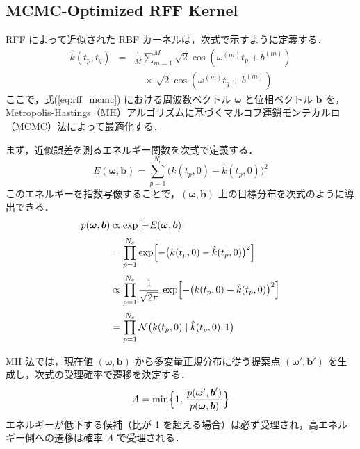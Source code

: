 \documentclass[conference]{IEEEtran}
\begin{document}
\subsection{MCMC-Optimized RFF Kernel}
RFF によって近似された RBF カーネルは，次式で示すように定義する．
\begin{eqnarray}
  \hat{k}(t_p,t_q)
    &=& \frac{1}{M}\sum_{m=1}^M \sqrt{2}\cos(\omega^{(m)}t_p + b^{(m)}) \nonumber\\
    &&\quad \times\,\sqrt{2}\cos(\omega^{(m)}t_q + b^{(m)})
  \label{eq:rff_mcmc}
\end{eqnarray}
ここで，式(\ref{eq:rff_mcmc}) における周波数ベクトル $\boldsymbol{\omega}$ と位相ベクトル $\boldsymbol{b}$ を，Metropolis-Hastings（MH）アルゴリズムに基づくマルコフ連鎖モンテカルロ（MCMC）法\cite{Hastings1970}によって最適化する．

まず，近似誤差を測るエネルギー関数を次式で定義する．
\begin{equation}
  E(\boldsymbol{\omega},\boldsymbol{b})
    = \sum_{p=1}^{N_c}
      \bigl(k(t_p,0) - \hat{k}(t_p,0)\bigr)^2
  \label{eq:energy}
\end{equation}
このエネルギーを指数写像することで，$(\boldsymbol{\omega},\boldsymbol{b})$ 上の目標分布を次式のように導出できる．
\begin{equation}
\begin{aligned}
  p(\boldsymbol{\omega},\boldsymbol{b})
  &\propto \exp\bigl[-E(\boldsymbol{\omega},\boldsymbol{b})\bigr] \\[2pt]
  &= \prod_{p=1}^{N_c}\exp\Bigl[-\bigl(k(t_p,0)-\hat{k}(t_p,0)\bigr)^2\Bigr] \\[2pt]
  &\propto \prod_{p=1}^{N_c}\frac{1}{\sqrt{2\pi}}\,
    \exp\Bigl[-\bigl(k(t_p,0)-\hat{k}(t_p,0)\bigr)^2\Bigr] \\[2pt]
  &= \prod_{p=1}^{N_c}
    \mathcal{N}\bigl(k(t_p,0)\mid\hat{k}(t_p,0),1\bigr)
\end{aligned}
\label{eq:target}
\end{equation}

MH 法では，現在値 $(\boldsymbol{\omega},\boldsymbol{b})$ から多変量正規分布に従う提案点 $(\boldsymbol{\omega}',\boldsymbol{b}')$ を生成し，次式の受理確率で遷移を決定する．
\begin{equation}
  A = \min\Bigl\{1,\,
    \frac{p(\boldsymbol{\omega}',\boldsymbol{b}')}{p(\boldsymbol{\omega},\boldsymbol{b})}
  \Bigr\}
  \label{eq:accept}
\end{equation}
エネルギーが低下する候補（比が 1 を超える場合）は必ず受理され，高エネルギー側への遷移は確率 $A$ で受理される．
\end{document}

